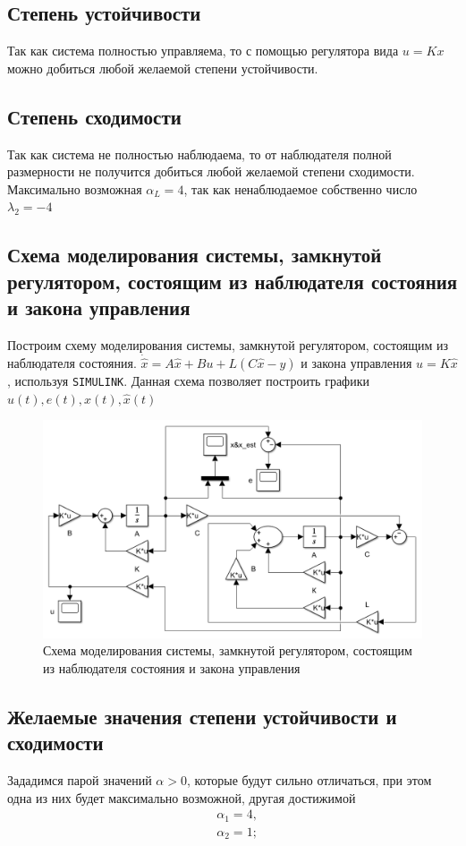 \documentclass[a4paper, 12pt]{article}
\begin{document}
    
    \subsection{Степень устойчивости}
    Так как система полностью управляема, то с помощью регулятора вида $u=Kx$ можно добиться
    любой желаемой степени устойчивости.


    \subsection{Степень сходимости}
    Так как система не полностью наблюдаема, то от наблюдателя полной размерности не получится
    добиться любой желаемой степени сходимости. Максимально возможная $\alpha_L=4$, так как
    ненаблюдаемое собственно число $\lambda_2=-4$


    \subsection{Схема моделирования системы, замкнутой регулятором, состоящим из наблюдателя состояния и закона управления}
    Построим схему моделирования системы, замкнутой регулятором, состоящим из наблюдателя состояния.
    $\dot{\hat{x}}=A\hat{x}+Bu+L\left( C\hat{x}-y \right)$ и закона управления $u=K\hat{x}$, используя \texttt{SIMULINK}.
    Данная схема позволяет построить графики $u(t),e(t),x(t),\hat{x}(t)$
    \begin{figure}[H]
        \centering
        \includegraphics[scale=0.5]{scheme_task2.png}
        \captionsetup{skip=0pt}
        \caption{Схема моделирования системы, замкнутой регулятором, состоящим из наблюдателя состояния и закона управления}
        \label{fig:scheme_task2}
    \end{figure}


    \subsection{Желаемые значения степени устойчивости и сходимости}
    Зададимся парой значений $\alpha>0$, которые будут сильно отличаться, при этом
    одна из них будет максимально возможной, другая достижимой
    \begin{align*}
        &\alpha_1=4,\\
        &\alpha_2=1;
    \end{align*}
\end{document}

